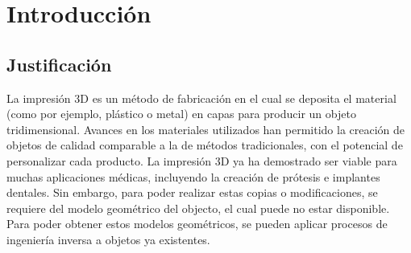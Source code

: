 \chapter{Introducción}

	\section{Justificación}
	La impresión 3D es un método de fabricación en el cual se deposita el material (como por ejemplo, plástico o metal) en capas para producir un objeto tridimensional.
	Avances en los materiales utilizados han permitido la creación de objetos de calidad comparable a la de métodos tradicionales, con el potencial de personalizar cada producto.
	La impresión 3D ya ha demostrado ser viable para muchas aplicaciones médicas, incluyendo la creación de prótesis e implantes dentales\cite{Schubert159}. %
	Sin embargo, para poder realizar estas copias o modificaciones,
	se requiere del modelo geométrico del objecto, el cual puede no estar disponible.
	Para poder obtener estos modelos geométricos,
	se pueden aplicar procesos de ingeniería inversa a objetos ya existentes.

